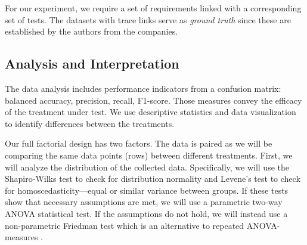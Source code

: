 For our experiment, we require a set of requirements linked with a corresponding set of tests. The datasets with trace links serve as \textit{ground truth} since these are established by the authors from the companies.

\subsection{Analysis and Interpretation}\label{sec:analysis}


The data analysis includes performance indicators from a confusion matrix: balanced accuracy, precision, recall, F1-score. Those measures convey the efficacy of the treatment under test. We use descriptive statistics and data visualization to identify differences between the treatments. 

Our full factorial design has two factors. The data is paired as we will be comparing the same data points (rows) between different treatments. First, we will analyze the distribution of the collected data. Specifically, we will use the Shapiro-Wilks test to check for distribution normality and Levene's test to check for homoscedasticity---equal or similar variance between groups. If these tests show that necessary assumptions are met, we will use a parametric two-way ANOVA statistical test. If the assumptions do not hold, we will instead use a non-parametric Friedman test which is an alternative to repeated ANOVA-measures \cite{mccrum2008statisticalTests}.

